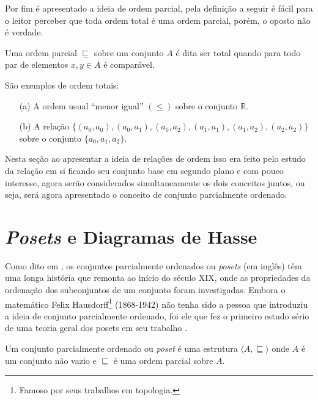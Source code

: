 Por fim é apresentado a ideia de ordem parcial, pela definição a seguir é fácil para o leitor perceber que toda ordem total é uma ordem parcial, porém, o oposto não é verdade.

\begin{definicao}
	Uma ordem parcial $\sqsubseteq$ sobre um conjunto $A$ é dita ser total quando para todo par de elementos $x, y \in A$ é comparável.
\end{definicao}

\begin{exemplo}
	São exemplos de ordem totais:
	\begin{itemize}
		\item[(a)] A ordem usual ``menor igual'' $(\leq)$ sobre o conjunto $\mathbb{R}$.
		\item[(b)] A relação $\{(a_0, a_0), (a_0, a_1), (a_0, a_2), (a_1, a_1), (a_1, a_2), (a_2, a_2)\}$ sobre o conjunto $\{a_0, a_1, a_2\}$.
	\end{itemize}
\end{exemplo}

Nesta seção ao apresentar a ideia de relações de ordem isso era feito pelo estudo da relação em si ficando seu conjunto base em segundo plano e com pouco interesse, agora serão considerados simultaneamente os dois conceitos juntos, ou seja, será agora apresentado o conceito de conjunto parcialmente ordenado.

\section{\textit{Posets} e Diagramas de Hasse}\label{sec:Poset}

Como dito em \cite{neggers1998poset},  os conjuntos parcialmente ordenados ou \textit{posets} (em inglês) têm uma longa história que remonta ao início do século XIX, onde as propriedades da ordenação dos subconjuntos de um conjunto foram investigadas.  Embora o matemático Felix Hausdorff\footnote{Famoso por seus trabalhos em topologia.} (1868-1942) não tenha sido a pessoa que introduziu a ideia de conjunto parcialmente ordenado, foi ele que fez o primeiro estudo sério de uma teoria geral dos posets em seu trabalho \cite{hausdorff1914poset}. 

\begin{definicao}[Poset]
	Um conjunto parcialmente ordenado ou \textit{poset} é uma estrutura $\langle A, \sqsubseteq \rangle$ onde $A$ é um conjunto não vazio e $\sqsubseteq$ é uma ordem parcial sobre $A$.
\end{definicao}

